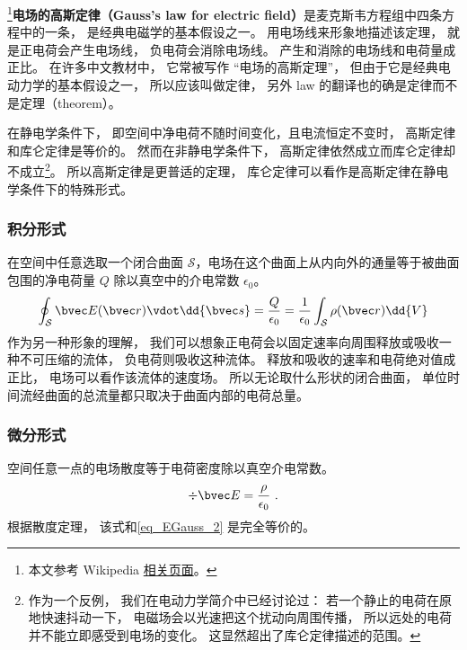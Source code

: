 

\footnote{本文参考 Wikipedia \href{https://en.wikipedia.org/wiki/Gauss's_law}{相关页面}。}\textbf{电场的高斯定律（Gauss's law for electric field）}是麦克斯韦方程组中四条方程中的一条， 是经典电磁学的基本假设之一。 用电场线来形象地描述该定理， 就是正电荷会产生电场线， 负电荷会消除电场线。 产生和消除的电场线和电荷量成正比。 在许多中文教材中， 它常被写作 “电场的高斯定理”， 但由于它是经典电动力学的基本假设之一， 所以应该叫做定律， 另外 law 的翻译也的确是定律而不是定理（theorem）。

在静电学条件下， 即空间中净电荷不随时间变化，且电流恒定不变时， 高斯定律和库仑定律是等价的。 然而在非静电学条件下， 高斯定律依然成立而库仑定律却不成立\footnote{作为一个反例， 我们在电动力学简介中已经讨论过： 若一个静止的电荷在原地快速抖动一下， 电磁场会以光速把这个扰动向周围传播， 所以远处的电荷并不能立即感受到电场的变化。 这显然超出了库仑定律描述的范围。}。 所以高斯定律是更普适的定理， 库仑定律可以看作是高斯定律在静电学条件下的特殊形式。

\subsubsection{积分形式}
在空间中任意选取一个闭合曲面 $\mathcal S$，电场在这个曲面上从内向外的通量等于被曲面包围的净电荷量 $Q$ 除以真空中的介电常数 $\epsilon_0$。
\begin{equation}\label{eq_EGauss_2}
\oint_{\mathcal S} \bvec E(\bvec r) \vdot \dd{\bvec s} = \frac{Q}{\epsilon_0} = \frac{1}{\epsilon_0} \int_{\mathcal S} \rho(\bvec r) \dd{V}
\end{equation}
作为另一种形象的理解， 我们可以想象正电荷会以固定速率向周围释放或吸收一种不可压缩的流体， 负电荷则吸收这种流体。 释放和吸收的速率和电荷绝对值成正比， 电场可以看作该流体的速度场。 所以无论取什么形状的闭合曲面， 单位时间流经曲面的总流量都只取决于曲面内部的电荷总量。

\subsubsection{微分形式}
空间任意一点的电场散度等于电荷密度除以真空介电常数。
\begin{equation}\label{eq_EGauss_1}
\div \bvec E = \frac{\rho}{\epsilon_0}~.
\end{equation}
根据散度定理， 该式和\autoref{eq_EGauss_2} 是完全等价的。

